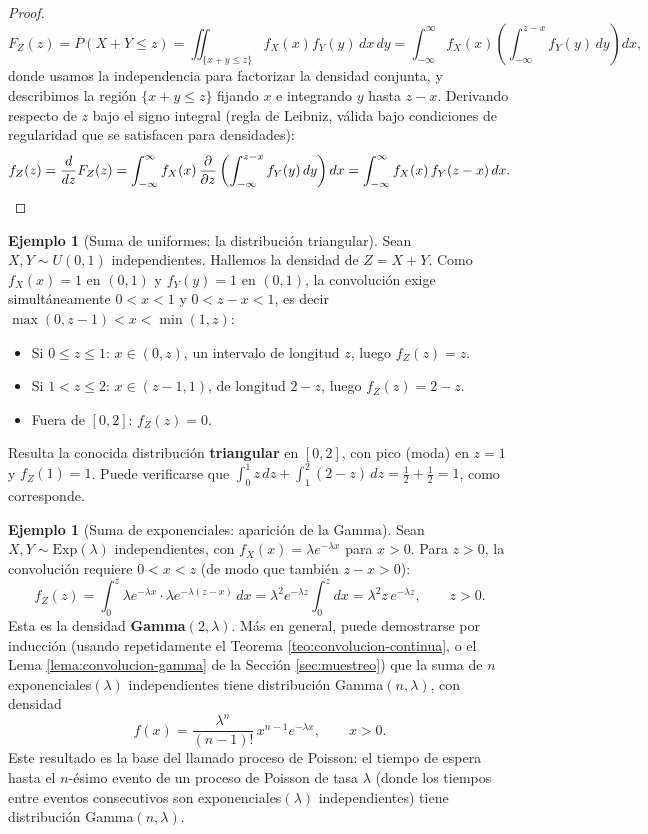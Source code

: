 \documentclass[11pt,a4paper]{article}
\theoremstyle{plain}
\theoremstyle{definition}
\newtheorem{ejemplo}[teorema]{Ejemplo}
\theoremstyle{remark}
\begin{document}
\begin{proof}
\[
F_Z(z) = P(X+Y\le z) = \iint_{\{x+y\le z\}} f_X(x)f_Y(y)\,dx\,dy = \int_{-\infty}^{\infty} f_X(x)\left(\int_{-\infty}^{z-x} f_Y(y)\,dy\right) dx,
\]
donde usamos la independencia para factorizar la densidad conjunta, y describimos la región $\{x+y\le z\}$ fijando $x$ e integrando $y$ hasta $z-x$. Derivando respecto de $z$ bajo el signo integral (regla de Leibniz, válida bajo condiciones de regularidad que se satisfacen para densidades):
\[
f_Z(z) = \frac{d}{dz}F_Z(z) = \int_{-\infty}^{\infty} f_X(x)\,\frac{\partial}{\partial z}\left(\int_{-\infty}^{z-x}f_Y(y)\,dy\right)dx = \int_{-\infty}^{\infty} f_X(x)\,f_Y(z-x)\,dx. \qedhere
\]
\end{proof}

\begin{ejemplo}[Suma de uniformes: la distribución triangular]\label{ej:suma-uniformes}
Sean $X,Y\sim U(0,1)$ independientes. Hallemos la densidad de $Z=X+Y$. Como $f_X(x)=1$ en $(0,1)$ y $f_Y(y)=1$ en $(0,1)$, la convolución exige simultáneamente $0<x<1$ y $0<z-x<1$, es decir $\max(0,z-1)<x<\min(1,z)$:
\begin{itemize}
\item Si $0\le z\le1$: $x\in(0,z)$, un intervalo de longitud $z$, luego $f_Z(z)=z$.
\item Si $1<z\le2$: $x\in(z-1,1)$, de longitud $2-z$, luego $f_Z(z)=2-z$.
\item Fuera de $[0,2]$: $f_Z(z)=0$.
\end{itemize}
Resulta la conocida distribución \textbf{triangular} en $[0,2]$, con pico (moda) en $z=1$ y $f_Z(1)=1$. Puede verificarse que $\int_0^1 z\,dz+\int_1^2(2-z)\,dz = \tfrac12+\tfrac12=1$, como corresponde.
\end{ejemplo}

\begin{ejemplo}[Suma de exponenciales: aparición de la Gamma]\label{ej:suma-exponenciales}
Sean $X,Y\sim\text{Exp}(\lambda)$ independientes, con $f_X(x)=\lambda e^{-\lambda x}$ para $x>0$. Para $z>0$, la convolución requiere $0<x<z$ (de modo que también $z-x>0$):
\[
f_Z(z) = \int_0^z \lambda e^{-\lambda x}\cdot\lambda e^{-\lambda(z-x)}\,dx = \lambda^2 e^{-\lambda z}\int_0^z dx = \lambda^2 z\,e^{-\lambda z}, \qquad z>0.
\]
Esta es la densidad \textbf{Gamma}$(2,\lambda)$. Más en general, puede demostrarse por inducción (usando repetidamente el Teorema \ref{teo:convolucion-continua}, o el Lema \ref{lema:convolucion-gamma} de la Sección \ref{sec:muestreo}) que la suma de $n$ exponenciales$(\lambda)$ independientes tiene distribución Gamma$(n,\lambda)$, con densidad
\[
f(x) = \frac{\lambda^n}{(n-1)!}\,x^{n-1}e^{-\lambda x}, \qquad x>0.
\]
Este resultado es la base del llamado proceso de Poisson: el tiempo de espera hasta el $n$-ésimo evento de un proceso de Poisson de tasa $\lambda$ (donde los tiempos entre eventos consecutivos son exponenciales$(\lambda)$ independientes) tiene distribución Gamma$(n,\lambda)$.
\end{ejemplo}
\end{document}
